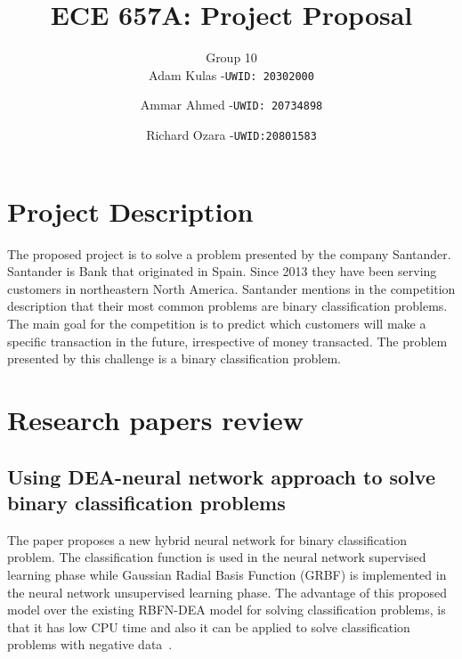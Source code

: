 \documentclass{llncs}
\begin{document}
%
\title{ECE 657A: Project Proposal}
%
%
\author{Group 10 \\ Adam Kulas -\texttt{UWID: 20302000}\and
Ammar Ahmed -\texttt{UWID: 20734898}\and
Richard Ozara -\texttt{UWID:20801583}}
%
%
%
\maketitle              %


\section{Project Description}

The proposed project is to solve a problem presented by the company Santander. Santander is Bank that originated in Spain. Since 2013 they have been serving customers in northeastern North America. Santander mentions in the competition description that their most common problems are binary classification problems. The main goal for the competition is to predict which customers will make a specific transaction in the future, irrespective of money transacted. The problem presented by this challenge is a binary classification problem.

\section{Research papers review}
\subsection{Using DEA-neural network approach to solve binary classification problems}
The paper proposes a new hybrid neural network for binary classification problem. The classification function is used in the neural network supervised learning phase while Gaussian Radial Basis Function (GRBF) is implemented in the neural network unsupervised learning phase. The advantage of this proposed model over the existing RBFN-DEA model for solving classification problems, is that it has low CPU time and also it can be applied to solve classification problems with negative data~\cite{ref_article1}.
\end{document}
